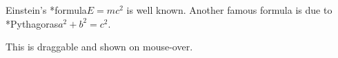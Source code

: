 \documentclass[a6paper,12pt]{scrbook}
\begin{document}
\Huge
  Einstein's \tooltip**{formula}{$E=m c^2$} is well known.
  Another famous formula is due to \tooltip**{Pythagoras}{$a^2+b^2=c^2$}.

  This  is draggable and shown on mouse-over.
\end{document}
